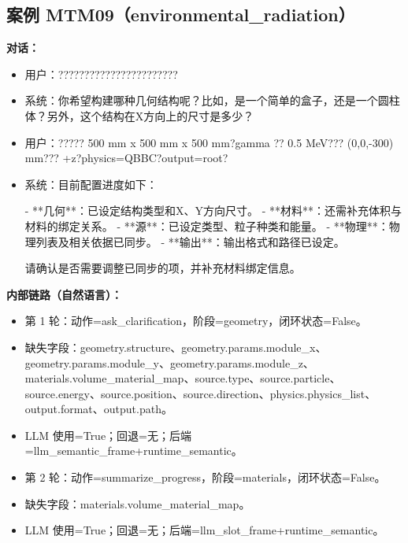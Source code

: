 \documentclass[11pt]{ctexart}
\begin{document}
\subsection{案例 MTM09（environmental\_radiation）}
\textbf{对话：}
\begin{itemize}
\item 用户：???????????????????????
\item 系统：你希望构建哪种几何结构呢？比如，是一个简单的盒子，还是一个圆柱体？另外，这个结构在X方向上的尺寸是多少？
\item 用户：????? 500 mm x 500 mm x 500 mm?gamma ?? 0.5 MeV??? (0,0,-300) mm??? +z?physics=QBBC?output=root?
\item 系统：目前配置进度如下：

- **几何**：已设定结构类型和X、Y方向尺寸。
- **材料**：还需补充体积与材料的绑定关系。
- **源**：已设定类型、粒子种类和能量。
- **物理**：物理列表及相关依据已同步。
- **输出**：输出格式和路径已设定。

请确认是否需要调整已同步的项，并补充材料绑定信息。
\end{itemize}
\textbf{内部链路（自然语言）：}
\begin{itemize}
\item 第 1 轮：动作=ask\_clarification，阶段=geometry，闭环状态=False。
\item 缺失字段：geometry.structure、geometry.params.module\_x、geometry.params.module\_y、geometry.params.module\_z、materials.volume\_material\_map、source.type、source.particle、source.energy、source.position、source.direction、physics.physics\_list、output.format、output.path。
\item LLM 使用=True；回退=无；后端=llm\_semantic\_frame+runtime\_semantic。
\item 第 2 轮：动作=summarize\_progress，阶段=materials，闭环状态=False。
\item 缺失字段：materials.volume\_material\_map。
\item LLM 使用=True；回退=无；后端=llm\_slot\_frame+runtime\_semantic。
\end{itemize}
\end{document}
